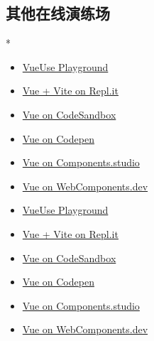 \begin{paracol}{2}
\subsection{其他在线演练场}
\switchcolumn[0]*%
\begin{itemize}
\item
  \href{https://play.vueuse.org/}{VueUse Playground}
\item
  \href{https://replit.com/@templates/VueJS-with-Vite}{Vue + Vite on
  Repl.it}
\item
  \href{https://codesandbox.io/s/vue-3}{Vue on CodeSandbox}
\item
  \href{https://codepen.io/pen/editor/vue}{Vue on Codepen}
\item
  \href{https://components.studio/create/vue3}{Vue on Components.studio}
\item
  \href{https://webcomponents.dev/create/cevue}{Vue on
  WebComponents.dev}
\end{itemize}
\switchcolumn
\begin{itemize}
\item
  \href{https://play.vueuse.org/}{VueUse Playground}
\item
  \href{https://replit.com/@templates/VueJS-with-Vite}{Vue + Vite on
  Repl.it}
\item
  \href{https://codesandbox.io/s/vue-3}{Vue on CodeSandbox}
\item
  \href{https://codepen.io/pen/editor/vue}{Vue on Codepen}
\item
  \href{https://components.studio/create/vue3}{Vue on Components.studio}
\item
  \href{https://webcomponents.dev/create/cevue}{Vue on
  WebComponents.dev}
\end{itemize}
\end{paracol}
 